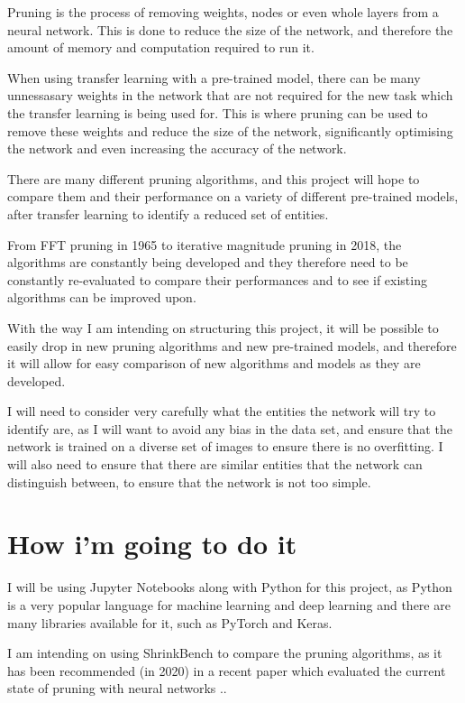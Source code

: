 \documentclass{article}
\begin{document}
Pruning is the process of removing weights, nodes or even whole layers from a neural network.
This is done to reduce the size of the network, and therefore the amount of memory and
computation required to run it.

When using transfer learning with a pre-trained model, there can be many
unnessasary weights in the network that are not required for the new task
which the transfer learning is being used for. This is where pruning can be used
to remove these weights and reduce the size of the network, significantly
optimising the network and even increasing the accuracy of the network.

There are many different pruning algorithms, and this project will hope to compare
them and their performance on a variety of different pre-trained models, after
transfer learning to identify a reduced set of entities.

From FFT pruning in 1965\cite{FFT} to iterative magnitude pruning in 2018\cite{LotteryTicket},
the algorithms are constantly being developed and they therefore need to be constantly re-evaluated
to compare their performances and to see if existing algorithms can be improved upon.

With the way I am intending on structuring this project, it will be possible to
easily drop in new pruning algorithms and new pre-trained models, and therefore
it will allow for easy comparison of new algorithms and models as they are developed.

I will need to consider very carefully what the entities the network will try
to identify are, as I will want to avoid any bias in the data set, and
ensure that the network is trained on a diverse set of images to ensure there is no
overfitting. I will also need to ensure that there are similar entities that the
network can distinguish between, to ensure that the network is not too simple.

\pagebreak

\section{How i'm going to do it}

I will be using Jupyter Notebooks\cite{Jupyter} along with Python for this project, as 
Python is a very popular language for machine learning and deep learning and there are many
libraries available for it, such as PyTorch\cite{PyTorch} and Keras\cite{Keras}.

I am intending on using ShrinkBench\cite{ShrinkBench} to compare the pruning algorithms,
as it has been recommended (in 2020) in a recent paper which evaluated the current state of pruning with neural networks
.\cite{DBLP:journals/corr/abs-2003-03033}.
\end{document}
